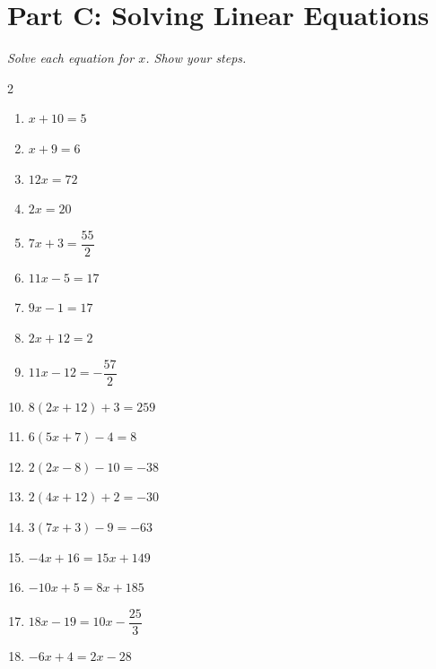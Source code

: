 \documentclass[11pt]{article}
\begin{document}
\section*{Part C: Solving Linear Equations}
\noindent\textit{Solve each equation for $x$. Show your steps.}
\begin{multicols}{2}
\begin{enumerate}
  \item $x + 10 = 5$
  \vspace{2.0cm}
  \item $x + 9 = 6$
  \vspace{2.0cm}
  \item $12x = 72$
  \vspace{2.0cm}
  \item $2x = 20$
  \vspace{2.0cm}
  \item $7x + 3 = \dfrac{55}{2}$
  \vspace{2.0cm}
  \item $11x - 5 = 17$
  \vspace{2.0cm}
  \item $9x - 1 = 17$
  \vspace{2.0cm}
  \item $2x + 12 = 2$
  \vspace{2.0cm}
  \item $11x - 12 = -\dfrac{57}{2}$
  \vspace{2.0cm}
  \item $8(2x + 12) + 3 = 259$
  \vspace{2.0cm}
  \item $6(5x + 7) - 4 = 8$
  \vspace{2.0cm}
  \item $2(2x - 8) - 10 = -38$
  \vspace{2.0cm}
  \item $2(4x + 12) + 2 = -30$
  \vspace{2.0cm}
  \item $3(7x + 3) - 9 = -63$
  \vspace{2.0cm}
  \item $-4x + 16 = 15x + 149$
  \vspace{2.0cm}
  \item $-10x + 5 = 8x + 185$
  \vspace{2.0cm}
  \item $18x - 19 = 10x - \dfrac{25}{3}$
  \vspace{2.0cm}
  \item $-6x + 4 = 2x - 28$
  \vspace{2.0cm}

\end{enumerate}
\end{multicols}
\end{document}
